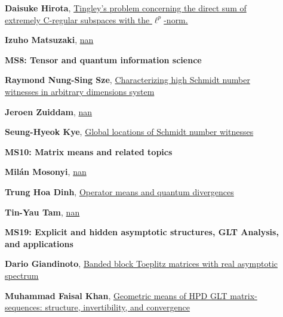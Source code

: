 \documentclass[ILAS2025-program.tex]{subfiles}
\begin{document}
\begin{description}
\begin{description}
        \item[] \hypertarget{up0248}{}\textbf{Daisuke Hirota}, \hyperlink{down0248}{Tingley's problem concerning the direct sum of extremely C-regular subspaces with the $\ell^p$-norm.}
        \item[] \hypertarget{up0249}{}\textbf{Izuho Matsuzaki}, \hyperlink{down0249}{nan}
        \end{description}
    \begin{description}
    \item[] {\color{mstitle}\textbf{MS8: Tensor and quantum information science}} 
    \item[] \hypertarget{up0250}{}\textbf{Raymond Nung-Sing Sze}, \hyperlink{down0250}{Characterizing high Schmidt number witnesses in arbitrary dimensions system
}
        \item[] \hypertarget{up0251}{}\textbf{Jeroen Zuiddam}, \hyperlink{down0251}{nan}
        \item[] \hypertarget{up0252}{}\textbf{Seung-Hyeok Kye}, \hyperlink{down0252}{Global locations of Schmidt number witnesses
}
        \end{description}
    \begin{description}
    \item[] {\color{mstitle}\textbf{MS10: Matrix means and related topics}} 
    \item[] \hypertarget{up0253}{}\textbf{Milán Mosonyi}, \hyperlink{down0253}{nan}
        \item[] \hypertarget{up0254}{}\textbf{Trung Hoa Dinh}, \hyperlink{down0254}{Operator means and quantum divergences}
        \item[] \hypertarget{up0255}{}\textbf{Tin-Yau Tam}, \hyperlink{down0255}{nan}
        \end{description}
    \begin{description}
    \item[] {\color{mstitle}\textbf{MS19: Explicit and hidden asymptotic structures, GLT Analysis, and applications}} 
    \item[] \hypertarget{up0256}{}\textbf{Dario Giandinoto}, \hyperlink{down0256}{Banded block Toeplitz matrices with real asymptotic spectrum
}
        \item[] \hypertarget{up0257}{}\textbf{Muhammad Faisal Khan}, \hyperlink{down0257}{Geometric means of HPD GLT matrix-sequences: structure, invertibility, and convergence}

\end{description}
\end{description}
\end{document}
